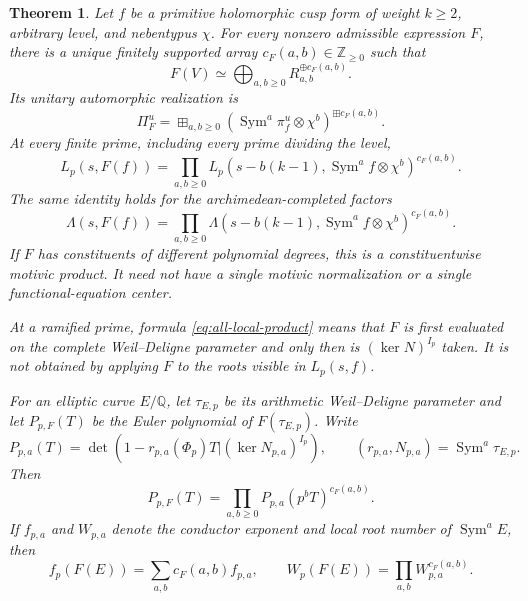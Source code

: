 \documentclass[11pt,reqno]{amsart}
\newtheorem{theorem}{Theorem}[section]
\theoremstyle{definition}
\theoremstyle{remark}
\newcommand{\Q}{\mathbb Q}
\newcommand{\Z}{\mathbb Z}
\newcommand{\Sym}{\operatorname{Sym}}
\begin{document}
\begin{theorem}\label{thm:global}
Let $f$ be a primitive holomorphic cusp form of weight $k\geq2$, arbitrary level, and nebentypus $\chi$.
For every nonzero admissible expression $F$,
there is a unique finitely supported array
$c_F(a,b)\in\Z_{\geq0}$ such that
\begin{equation}\label{eq:global-algebra-decomp}
 F(V)\simeq
 \bigoplus_{a,b\geq0}R_{a,b}^{\oplus c_F(a,b)}.
\end{equation}
Its unitary automorphic realization is
\begin{equation}\label{eq:unitary-lift}
 \Pi_F^u=
 \boxplus_{a,b\geq0}
 \left(\Sym^a\pi_f^u\otimes\chi^b\right)^{\boxplus c_F(a,b)}.
\end{equation}
At every finite prime, including every prime dividing the level,
\begin{equation}\label{eq:all-local-product}
 L_p(s,F(f))=
 \prod_{a,b\geq0}
 L_p\left(s-b(k-1),\Sym^af\otimes\chi^b\right)^{c_F(a,b)}.
\end{equation}
The same identity holds for the archimedean-completed factors
\begin{equation}\label{eq:completed-product}
 \Lambda(s,F(f))=
 \prod_{a,b\geq0}
\Lambda\left(s-b(k-1),\Sym^af\otimes\chi^b\right)^{c_F(a,b)}.
\end{equation}
If $F$ has constituents of different polynomial degrees, this is a constituentwise motivic product.
It need not have a single motivic normalization or a single functional-equation center.

At a ramified prime, formula \eqref{eq:all-local-product} means that $F$ is first evaluated on the complete Weil--Deligne parameter and only then is
$(\ker N)^{I_p}$ taken.
It is not obtained by applying $F$ to the roots visible in $L_p(s,f)$.

For an elliptic curve $E/\Q$, let $\tau_{E,p}$ be its arithmetic Weil--Deligne parameter and let $P_{p,F}(T)$ be the Euler polynomial of $F(\tau_{E,p})$.
Write
\begin{equation*}
 P_{p,a}(T)=\det\left(1-r_{p,a}(\Phi_p)T
 \mathrel{\big|}(\ker N_{p,a})^{I_p}\right),
 \qquad (r_{p,a},N_{p,a})=\Sym^a\tau_{E,p}.
\end{equation*}
Then
\begin{equation}\label{eq:intro-local-assembly}
 P_{p,F}(T)=
 \prod_{a,b\geq0}P_{p,a}(p^bT)^{c_F(a,b)}.
\end{equation}
If $f_{p,a}$ and $W_{p,a}$ denote the conductor exponent and local root number of $\Sym^aE$, then
\begin{equation}\label{eq:intro-conductor-root}
 f_p(F(E))=\sum_{a,b}c_F(a,b)f_{p,a},
 \qquad
 W_p(F(E))=\prod_{a,b}W_{p,a}^{c_F(a,b)}.
\end{equation}
\end{theorem}
\end{document}
